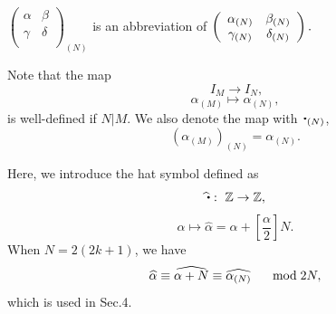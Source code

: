 \documentclass[12pt]{iopart}
\newcommand{\sbt}{\,\begin{picture}(-1,1)(-1,-3)\circle*{2}\end{picture}\ }
\begin{document}
\(
\left(\begin{array}{cc}
\alpha & \beta \\
\gamma & \delta \\
\end{array}\right)_{(N)}
\)
is an abbreviation of %
\(\displaystyle
\left(\begin{array}{cc}
\alpha_{(N)} & \beta_{(N)} \\\relax
\gamma_{(N)} & \delta_{(N)} \\
\end{array}\right).
\)

Note that the map
\begin{equation}
\ I_M\rightarrow I_N,
\end{equation}
\begin{equation}
\alpha_{(M)}\mapsto\alpha_{(N)},
\end{equation}
is well-defined if \(N|M\).
We also denote the map with \(\sbt_{(N)}\),
\begin{equation}
(\alpha_{(M)})_{(N)}=\alpha_{(N)}.
\end{equation}

Here, we introduce the hat symbol defined as
\begin{equation}
\widehat\sbt:\ \mathbb Z\rightarrow\mathbb Z,
\end{equation}
\begin{equation}
\alpha\mapsto\widehat\alpha=\alpha+\left[\frac\alpha2\right]N.
\end{equation}
%
When \(N=2(2k+1)\), we have
\begin{equation}
\widehat\alpha
\equiv
\widehat{\alpha+N}
\equiv
\widehat{\alpha_{(N)}}
\hspace{5mm}\bmod 2N,
\end{equation}
which is used in Sec.4.
\end{document}
